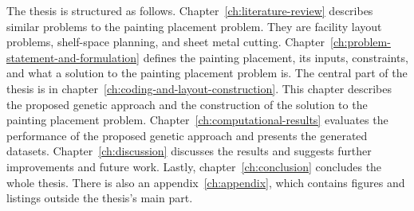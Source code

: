 The thesis is structured as follows.
Chapter~\ref{ch:literature-review} describes similar problems to the painting placement problem.
They are facility layout problems, shelf-space planning, and sheet metal cutting.
Chapter~\ref{ch:problem-statement-and-formulation} defines the painting placement, its inputs, constraints, and what a solution to the painting placement problem is.
The central part of the thesis is in chapter~\ref{ch:coding-and-layout-construction}.
This chapter describes the proposed genetic approach and the construction of the solution to the painting placement problem.
Chapter~\ref{ch:computational-results} evaluates the performance of the proposed genetic approach
and presents the generated datasets.
Chapter~\ref{ch:discussion} discusses the results and suggests further improvements and future work.
Lastly, chapter~\ref{ch:conclusion} concludes the whole thesis.
There is also an appendix~\ref{ch:appendix}, which contains figures and listings outside the thesis's main part.
